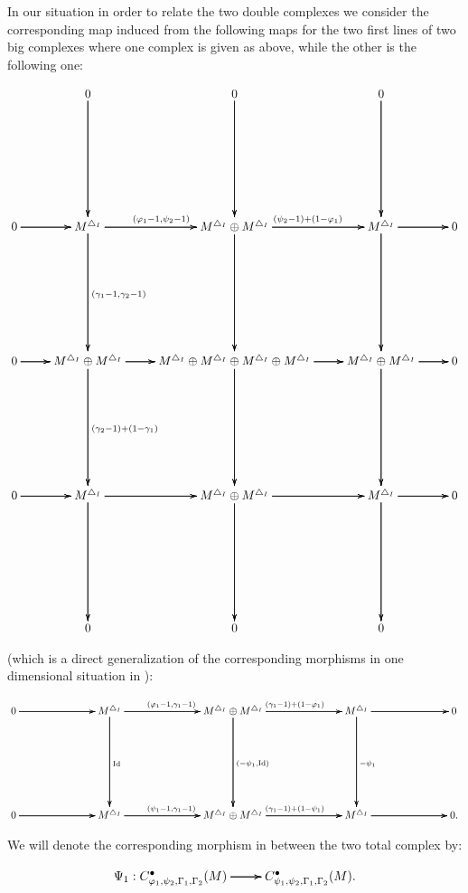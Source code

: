 \documentclass[12pt]{amsart}
\theoremstyle{definition}
\numberwithin{equation}{section}
\begin{document}
\indent In our situation in order to relate the two double complexes we consider the corresponding map induced from the following maps for the two first lines of two big complexes where one complex is given as above, while the other is the following one:


\begin{center}
\[
\xymatrix@R+6pc@C+0pc{
 &0\ar[d] \ar[d] \ar[d]  &0 \ar[d] \ar[d] \ar[d]  & 0 \ar[d] \ar[d] \ar[d] \\
0\ar[r] \ar[r] \ar[r] &M^{\triangle_I}\ar[d]^{(\gamma_1-1,\gamma_2-1)} \ar[d] \ar[d] \ar[r]^{(\varphi_1-1,\psi_2-1)} \ar[r] \ar[r] &M^{\triangle_I}\oplus M^{\triangle_I}\ar[d] \ar[d] \ar[d]\ar[r]^{(\psi_2-1)+(1-\varphi_1)} \ar[r] \ar[r]  & M^{\triangle_I}\ar[d] \ar[d] \ar[d] \ar[r] \ar[r] \ar[r] &0\\
0\ar[r] \ar[r] \ar[r] &M^{\triangle_I}\oplus M^{\triangle_I}\ar[d]^{(\gamma_2-1)+(1-\gamma_1)} \ar[d] \ar[d] \ar[r] \ar[r] \ar[r] &M^{\triangle_I}\oplus M^{\triangle_I}\oplus M^{\triangle_I}\oplus M^{\triangle_I}\ar[d] \ar[d] \ar[d]\ar[r] \ar[r] \ar[r]  & M^{\triangle_I}\oplus M^{\triangle_I}\ar[d] \ar[d] \ar[d] \ar[r] \ar[r] \ar[r] &0\\
0\ar[r] \ar[r] \ar[r] &M^{\triangle_I}\ar[d] \ar[d] \ar[d] \ar[r] \ar[r] \ar[r] &M^{\triangle_I}\oplus M^{\triangle_I}\ar[d] \ar[d] \ar[d]\ar[r] \ar[r] \ar[r]  & M^{\triangle_I}\ar[d] \ar[d] \ar[d] \ar[r] \ar[r] \ar[r] &0\\
&0 &0  & 0
}
\]
\end{center}

 (which is a direct generalization of the corresponding morphisms in one dimensional situation in \cite[Definition 2.3.3]{KPX}):

\[
\xymatrix@R+5pc@C+4pc{
0\ar[r] \ar[r] \ar[r] &M^{\triangle_I}\ar[d]^{\mathrm{Id}} \ar[d] \ar[d] \ar[r]^{(\varphi_1-1,\gamma_1-1)} \ar[r] \ar[r] &M^{\triangle_I}\oplus M^{\triangle_I}\ar[d]^{(-\psi_1,\mathrm{Id})} \ar[d] \ar[d]\ar[r]^{(\gamma_1-1)+(1-\varphi_1)} \ar[r] \ar[r]  & M^{\triangle_I}\ar[d]^{-\psi_1} \ar[d] \ar[d] \ar[r] \ar[r] \ar[r] &0\\
0\ar[r] \ar[r] \ar[r] &M^{\triangle_I} \ar[r]^{(\psi_1-1,\gamma_1-1)} \ar[r] \ar[r] &M^{\triangle_I}\oplus M^{\triangle_I}\ar[r]^{(\gamma_1-1)+(1-\psi_1)} \ar[r] \ar[r]  & M^{\triangle_I} \ar[r] \ar[r] \ar[r] &0
.}
\]


We will denote the corresponding morphism in between the two total complex by:


\[
\xymatrix@R+0pc@C+0pc{
\Psi_1: C^\bullet_{\varphi_1,\psi_2,\Gamma_1,\Gamma_2}(M) \ar[r] \ar[r] \ar[r]  & C^\bullet_{\psi_1,\psi_2,\Gamma_1,\Gamma_2}(M)
.}
\]
\end{document}
